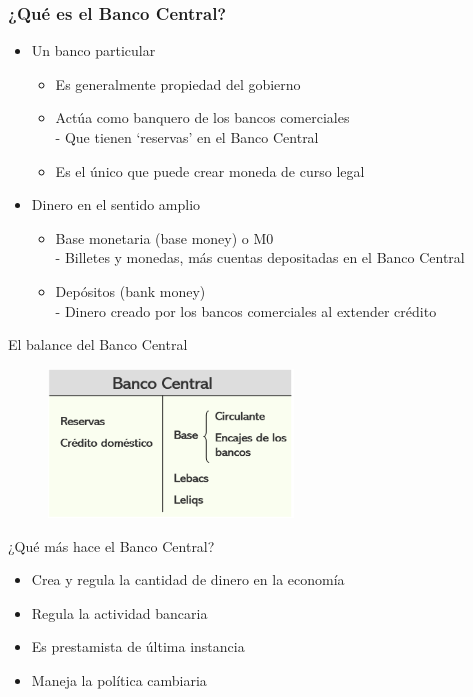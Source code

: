 \documentclass{beamer}
\begin{document}
\begin{frame}
\frametitle{¿Qué es el Banco Central?}
\begin{itemize}
    \item Un banco particular
        \begin{itemize}
            \item Es generalmente propiedad del gobierno
            \item Actúa como banquero de los bancos comerciales \\
            - Que tienen `reservas' en el Banco Central
            \item Es el único que puede crear moneda de curso legal
        \end{itemize}
    \item Dinero en el sentido amplio
        \begin{itemize}
            \item Base monetaria (base money) o M0 \\
            - Billetes y monedas, más cuentas depositadas en el Banco Central
            \item Depósitos (bank money) \\
            - Dinero creado por los bancos comerciales al extender crédito
        \end{itemize}
\end{itemize}
\end{frame}

\begin{frame}{El balance del Banco Central}
\begin{figure} [H] 
\centering
\includegraphics[width=6.5cm]{Slides Principios de Economia/Figures/P48.png}\
\end{figure}

\end{frame}

\begin{frame}{¿Qué más hace el Banco Central?}
    \begin{itemize}
    \item Crea y regula la cantidad de dinero en la economía
    \vspace{1mm}
    \item Regula la actividad bancaria
    \vspace{1mm}
    \item Es prestamista de última instancia
    \vspace{1mm}
    \item Maneja la política cambiaria 
\end{itemize}
\end{frame}
\end{document}
